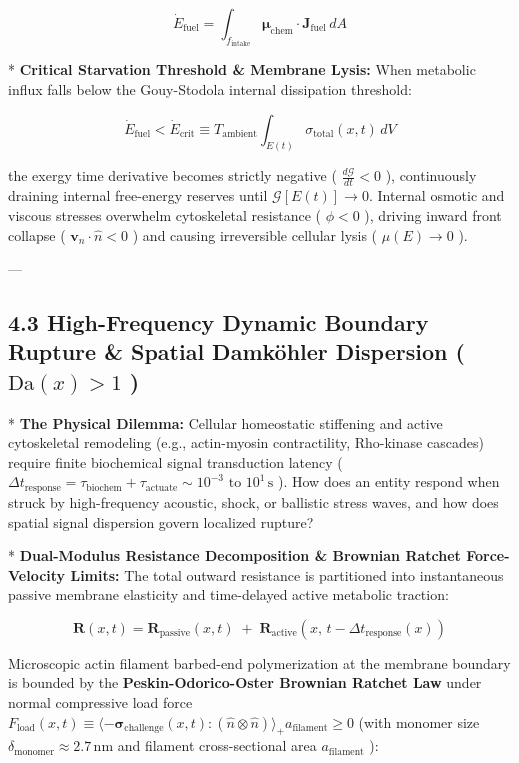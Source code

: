 \documentclass[11pt,a4paper]{article}
\theoremstyle{definition}
\theoremstyle{remark}
\begin{document}
\begin{equation}
\dot{E}_{\text{fuel}} = \int_{f_{\text{intake}}} \boldsymbol{\mu}_{\text{chem}} \cdot \mathbf{J}_{\text{fuel}} \, dA
\end{equation}


* \textbf{Critical Starvation Threshold \& Membrane Lysis:}
When metabolic influx falls below the Gouy-Stodola internal dissipation threshold:


\begin{equation}
\dot{E}_{\text{fuel}} < \dot{E}_{\text{crit}} \equiv T_{\text{ambient}} \int_{E(t)} \sigma_{\text{total}}(x, t) \, dV
\end{equation}


the exergy time derivative becomes strictly negative ( $\frac{d\mathcal{G}}{dt} < 0$ ), continuously draining internal free-energy reserves until $\mathcal{G}[E(t)] \to 0$. Internal osmotic and viscous stresses overwhelm cytoskeletal resistance ( $\phi < 0$ ), driving inward front collapse ( $\mathbf{v}_n \cdot \hat{n} < 0$ ) and causing irreversible cellular lysis ( $\mu(E) \to 0$ ).

---

\subsection{4.3 High-Frequency Dynamic Boundary Rupture \& Spatial Damköhler Dispersion ( $\mathrm{Da}(x) > 1$ )}
* \textbf{The Physical Dilemma:} Cellular homeostatic stiffening and active cytoskeletal remodeling (e.g., actin-myosin contractility, Rho-kinase cascades) require finite biochemical signal transduction latency ( $\Delta t_{\text{response}} = \tau_{\text{biochem}} + \tau_{\text{actuate}} \sim 10^{-3}\text{ to } 10^1 \, \mathrm{s}$ ). How does an entity respond when struck by high-frequency acoustic, shock, or ballistic stress waves, and how does spatial signal dispersion govern localized rupture?

* \textbf{Dual-Modulus Resistance Decomposition \& Brownian Ratchet Force-Velocity Limits:}
The total outward resistance is partitioned into instantaneous passive membrane elasticity and time-delayed active metabolic traction:


\begin{equation}
\mathbf{R}(x, t) = \mathbf{R}_{\text{passive}}(x, t) \;+\; \mathbf{R}_{\text{active}}\left(x, \, t - \Delta t_{\text{response}}(x)\right)
\end{equation}


Microscopic actin filament barbed-end polymerization at the membrane boundary is bounded by the \textbf{Peskin-Odorico-Oster Brownian Ratchet Law} under normal compressive load force $F_{\text{load}}(x, t) \equiv \langle -\boldsymbol{\sigma}_{\text{challenge}}(x, t) : (\hat{n} \otimes \hat{n}) \rangle_+ a_{\text{filament}} \ge 0$ (with monomer size $\delta_{\text{monomer}} \approx 2.7 \, \mathrm{nm}$ and filament cross-sectional area $a_{\text{filament}}$ ):
\end{document}
